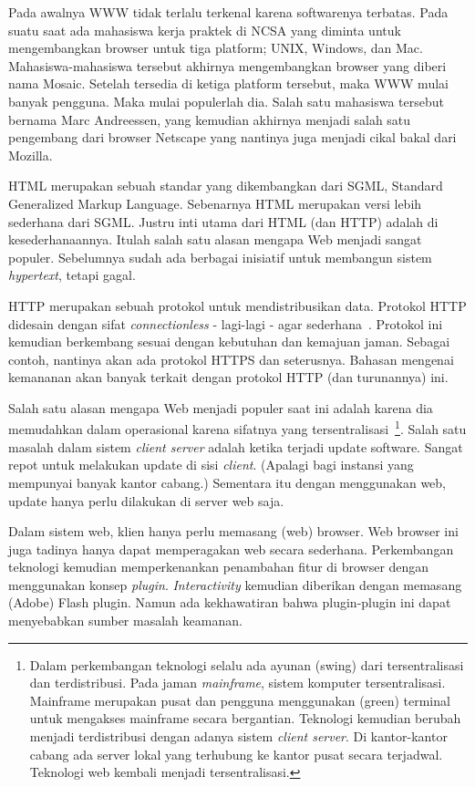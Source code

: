 Pada awalnya WWW tidak terlalu terkenal karena softwarenya terbatas. Pada suatu
saat ada mahasiswa kerja praktek di NCSA yang diminta untuk mengembangkan
browser untuk tiga platform; UNIX, Windows, dan Mac. Mahasiswa-mahasiswa
tersebut akhirnya mengembangkan browser yang diberi nama Mosaic. Setelah
tersedia di ketiga platform tersebut, maka WWW mulai banyak pengguna. Maka
mulai populerlah dia. Salah satu mahasiswa tersebut bernama Marc Andreessen,
yang kemudian akhirnya menjadi salah satu pengembang dari browser Netscape yang
nantinya juga menjadi cikal bakal dari Mozilla.

HTML merupakan sebuah standar yang dikembangkan dari SGML, Standard Generalized
Markup Language. Sebenarnya HTML merupakan versi lebih sederhana dari SGML.
Justru inti utama dari HTML (dan HTTP) adalah di kesederhanaannya. Itulah
salah satu alasan mengapa Web menjadi sangat populer. Sebelumnya sudah ada
berbagai inisiatif untuk membangun sistem {\em hypertext}, tetapi gagal.

HTTP merupakan sebuah protokol untuk mendistribusikan data.  Protokol HTTP
didesain dengan sifat {\em connectionless} - lagi-lagi - agar
sederhana~\cite{RFC2068}. Protokol ini kemudian berkembang sesuai dengan
kebutuhan dan kemajuan jaman. Sebagai contoh, nantinya akan ada protokol HTTPS
dan seterusnya. Bahasan mengenai kemananan akan banyak terkait dengan protokol
HTTP (dan turunannya) ini.

Salah satu alasan mengapa Web menjadi populer saat ini adalah karena dia
memudahkan dalam operasional karena sifatnya yang
tersentralisasi~\footnote{Dalam perkembangan teknologi selalu ada ayunan
(swing) dari tersentralisasi dan terdistribusi. Pada jaman {\em mainframe},
sistem komputer tersentralisasi. Mainframe merupakan pusat dan pengguna
menggunakan (green) terminal untuk mengakses mainframe secara bergantian.
Teknologi kemudian berubah menjadi terdistribusi dengan adanya sistem {\em
client server}. Di kantor-kantor cabang ada server lokal yang terhubung ke
kantor pusat secara terjadwal. Teknologi web kembali menjadi tersentralisasi.}.
Salah satu masalah dalam sistem {\em client server} adalah ketika terjadi
update software. Sangat repot untuk melakukan update di sisi {\em client}.
(Apalagi bagi instansi yang mempunyai banyak kantor cabang.) Sementara itu
dengan menggunakan web, update hanya perlu dilakukan di server web saja.

Dalam sistem web, klien hanya perlu memasang (web) browser. Web browser ini
juga tadinya hanya dapat memperagakan web secara sederhana. Perkembangan
teknologi kemudian memperkenankan penambahan fitur di browser dengan
menggunakan konsep {\em plugin}. {\em Interactivity} kemudian diberikan dengan
memasang (Adobe) Flash plugin. Namun ada kekhawatiran bahwa plugin-plugin ini
dapat menyebabkan sumber masalah keamanan.

